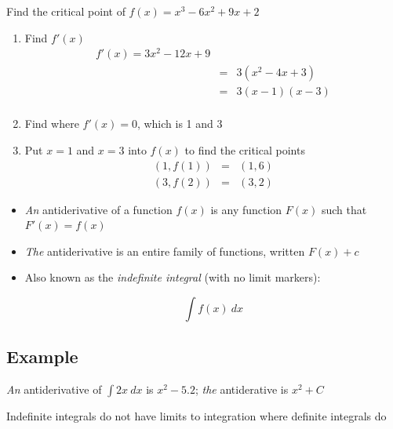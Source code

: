 Find the critical point of $f(x) = x^3 - 6x^2 + 9x + 2$

\begin{enumerate}
    \item Find $f'(x)$
        \begin{eqnarray}
            f'(x)  =  3x^2 - 12x + 9  \\
                  &=& 3(x^2 - 4x + 3) \\
                  &=& 3(x - 1)(x - 3) \\
         \end{eqnarray}
     \item Find where $f'(x) = 0$, which is 1 and 3
     \item Put $x=1$ and $x=3$ into $f(x)$ to find the critical points
         \begin{eqnarray}
             (1, f(1)) &=& (1, 6) \\
             (3, f(2)) &=& (3, 2)         
         \end{eqnarray}
\end{enumerate}
\hformbar




\begin{itemize}
    \item \textit{An} antiderivative of a function $f(x)$ is any function $F(x)$ such that $F'(x) = f(x)$
    \item \textit{The} antiderivative is an entire family of functions, written $F(x) + c$
    \item Also known as the \textit{indefinite integral} (with no limit markers):
    
    \begin{equation}
        \int f(x)~ dx
    \end{equation}
\end{itemize}

\subsection*{Example}

\textit{An} antiderivative of $\int 2x~ dx$ is $x^2 - 5.2$; \textit{the} antiderative is $x^2 + C$
\hformbar




Indefinite integrals do not have limits to integration where definite integrals do
\hformbar



